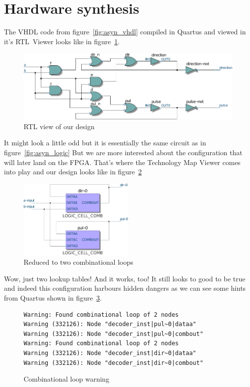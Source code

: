 \documentclass[a4paper]{article}
\begin{document}
\section{Hardware synthesis}
The VHDL code from figure~\ref{fig:asyn_vhdl} compiled in Quartus and viewed in it's RTL~Viewer looks like in figure~\ref{fig:asyn_rtl}.
\begin{figure}[h]
\centering
\includegraphics[width=\textwidth]{asynchronous_quadrature_decoder_quartus_rtl.pdf}
\caption{RTL view of our design}
\label{fig:asyn_rtl}
\end{figure}
It might look a little odd but it is essentially the same circuit as in figure~\ref{fig:asyn_logic}
But we are more interested about the configuration that will later land on the FPGA.
That's where the Technology Map Viewer comes into play and our design looks like in figure~\ref{fig:asyn_map}
\begin{figure}[h]
\centering
\includegraphics[width=0.5\textwidth]{asynchronous_quadrature_decoder_quartus_map.pdf}
\caption{Reduced to two combinational loops}
\label{fig:asyn_map}
\end{figure}
Wow, just two lookup tables! And it works, too!
It still looks to good to be true and indeed this configuration harbours hidden dangers as we can see some hints from Quartus shown in figure~\ref{fig:warning}.
\begin{figure}[h]
\centering
\begin{BVerbatim}
Warning: Found combinational loop of 2 nodes
Warning (332126): Node "decoder_inst|pul~0|dataa"
Warning (332126): Node "decoder_inst|pul~0|combout"
Warning: Found combinational loop of 2 nodes
Warning (332126): Node "decoder_inst|dir~0|dataa"
Warning (332126): Node "decoder_inst|dir~0|combout"
\end{BVerbatim}
\caption{Combinational loop warning}
\label{fig:warning}
\end{figure}
\end{document}

